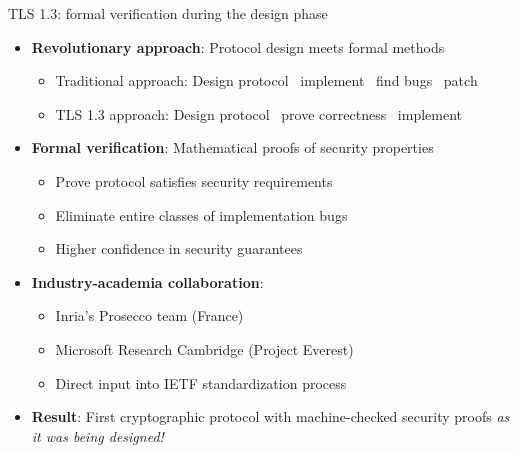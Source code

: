 \documentclass[aspectratio=169, lualatex, handout]{beamer}
\begin{document}
\begin{frame}{TLS 1.3: formal verification during the design phase}
	\begin{itemize}[<+->]
		\item \textbf{Revolutionary approach}: Protocol design meets formal methods
		      \begin{itemize}
			      \item Traditional approach: Design protocol \rightarrow\ implement \rightarrow\ find bugs \rightarrow\ patch
			      \item TLS 1.3 approach: Design protocol \rightarrow\ prove correctness \rightarrow\ implement
		      \end{itemize}
		\item \textbf{Formal verification}: Mathematical proofs of security properties
		      \begin{itemize}
			      \item Prove protocol satisfies security requirements
			      \item Eliminate entire classes of implementation bugs
			      \item Higher confidence in security guarantees
		      \end{itemize}
		\item \textbf{Industry-academia collaboration}:
		      \begin{itemize}
			      \item Inria's Prosecco team (France)
			      \item Microsoft Research Cambridge (Project Everest)
			      \item Direct input into IETF standardization process
		      \end{itemize}
		\item \textbf{Result}: First cryptographic protocol with machine-checked security proofs \textit{as it was being designed!}
	\end{itemize}
\end{frame}
\end{document}
